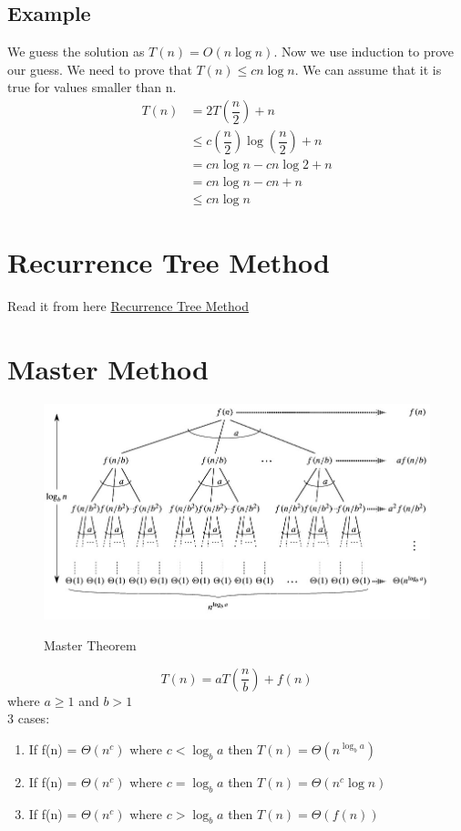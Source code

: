 \documentclass[a4paper,oneside]{book}
\begin{document}
\subsection{Example}
We guess the solution as $T(n) = O(n \log n)$. Now we use induction to prove our guess.
We need to prove that $T(n) \le cn \log n$. We can assume that it is true for values smaller than n.
\begin{align*}
T(n) &= 2T \left(\dfrac{n}{2}\right) + n \\
         & \le c \left(\dfrac{n}{2}\right) \log \left(\dfrac{n}{2}\right) + n \\
         & =  cn \log n - cn \log 2 + n \\
        & =  cn \log n - cn + n \\
       & \le cn \log n
\label{ex:substitution_method}
\end{align*}
\section{Recurrence Tree Method}
Read it from here \href{http://www.geeksforgeeks.org/analysis-algorithm-set-4-master-method-solving-recurrences/}{Recurrence Tree Method}
\section{Master Method}
\begin{figure}[H]
\caption{Master Theorem}
\includegraphics{Images/Master-Theorem}
\label{fig:master_theorem}
\end{figure}
$$ T(n) = aT\left(\dfrac{n}{b}\right) + f(n) $$ where $a \ge 1$ and $ b > 1$ \\
3 cases:
\begin{enumerate}
\item   If f(n) = $\Theta \left(n^{c}\right)$ where $c < \log _{b}a$ then $T(n) = \Theta \left(n^{\log _{b}a}\right)$
\item   If f(n) = $\Theta \left(n^{c}\right)$ where $c = \log _{b}a$ then $T(n) = \Theta \left(n^{c}\log n\right)$
\item   If f(n) = $\Theta \left(n^{c}\right)$ where $c > \log _{b}a$ then $T(n) = \Theta \left(f(n)\right)$
\end{enumerate}
\end{document}
